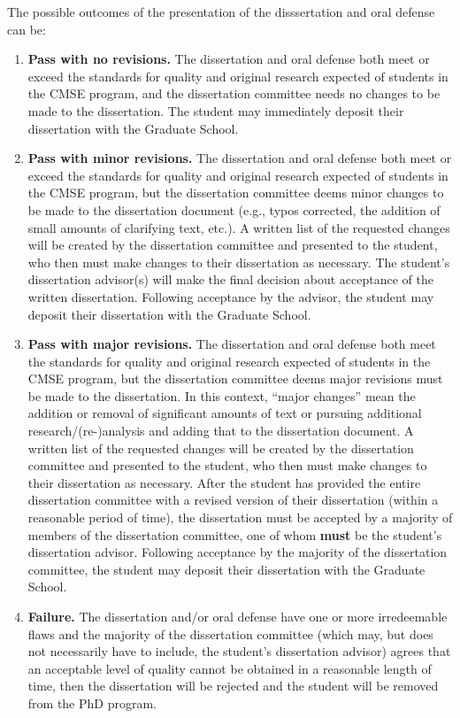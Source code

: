 The possible outcomes of the presentation of the disssertation and oral defense can be:

\begin{enumerate}

\item \textbf{Pass with no revisions.}  The dissertation and oral
  defense both meet or exceed the standards for quality and original
  research expected of students in the CMSE program, and the dissertation
  committee needs no changes to be made to the dissertation.  The
  student may immediately deposit their dissertation with the Graduate
  School.

\item  \textbf{Pass with minor revisions.}  The dissertation and oral
  defense both meet or exceed the standards  for quality and original
  research expected of students in the CMSE program, but the dissertation
  committee deems minor changes to be made to the dissertation
  document (e.g., typos corrected, the addition of small amounts of
  clarifying text, etc.).  A written list of the requested changes
  will be created by the dissertation committee and presented to the
  student, who then must make changes to their dissertation as
  necessary.  The student's dissertation advisor(s) will make the
  final decision about acceptance of the written dissertation.
  Following acceptance by the advisor, the student may deposit their
  dissertation with the Graduate School.

\item  \textbf{Pass with major revisions.}  The dissertation and oral
  defense both meet the standards for quality and original research
  expected of students in the CMSE program, but the dissertation committee
  deems major revisions must be made to the dissertation.  In this
  context, ``major changes'' mean the addition or removal of significant
  amounts of text or pursuing additional research/(re-)analysis and
  adding that to the dissertation document.  A written list of the
  requested changes will be created by the dissertation committee and
  presented to the student, who then must make changes to their
  dissertation as necessary.  After the student has provided the
  entire dissertation committee with a revised version of their dissertation
  (within a reasonable period of time), the dissertation must be accepted by
  a majority of members of the dissertation committee, one of whom
  \textbf{must} be the student's dissertation advisor.  Following acceptance
  by the majority of the dissertation committee, the student may deposit
  their dissertation with the Graduate School.

\item  \textbf{Failure.} The dissertation and/or oral defense have one
  or more irredeemable flaws and the majority of the dissertation
  committee (which may, but does not necessarily have to include, the student's dissertation advisor)
  agrees that an acceptable level of quality cannot be obtained in a
  reasonable length of time, then the dissertation will be rejected
  and the student will be removed from the PhD program.


\end{enumerate}

